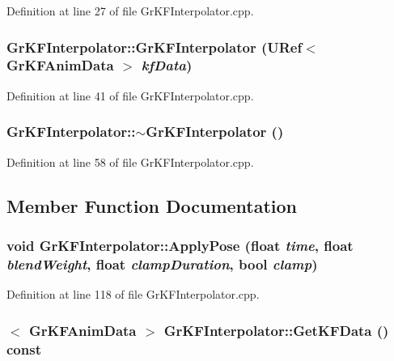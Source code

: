 Definition at line 27 of file GrKFInterpolator.cpp.\hypertarget{class_gr_k_f_interpolator_1724d4329b259e148c29d9169f612997}{
\subsubsection[{GrKFInterpolator}]{\setlength{\rightskip}{0pt plus 5cm}GrKFInterpolator::GrKFInterpolator ({\bf URef}$<$ {\bf GrKFAnimData} $>$ {\em kfData})}}
\label{class_gr_k_f_interpolator_1724d4329b259e148c29d9169f612997}




Definition at line 41 of file GrKFInterpolator.cpp.\hypertarget{class_gr_k_f_interpolator_c2cc750b63e0b4472fee654ec4bdea03}{
\subsubsection[{$\sim$GrKFInterpolator}]{\setlength{\rightskip}{0pt plus 5cm}GrKFInterpolator::$\sim$GrKFInterpolator ()}}
\label{class_gr_k_f_interpolator_c2cc750b63e0b4472fee654ec4bdea03}




Definition at line 58 of file GrKFInterpolator.cpp.

\subsection{Member Function Documentation}
\hypertarget{class_gr_k_f_interpolator_9733ebb52f02dff2b41993a80f199b3e}{
\subsubsection[{ApplyPose}]{\setlength{\rightskip}{0pt plus 5cm}void GrKFInterpolator::ApplyPose (float {\em time}, \/  float {\em blendWeight}, \/  float {\em clampDuration}, \/  bool {\em clamp})}}
\label{class_gr_k_f_interpolator_9733ebb52f02dff2b41993a80f199b3e}




Definition at line 118 of file GrKFInterpolator.cpp.\hypertarget{class_gr_k_f_interpolator_204daa62f5b8f1dbc7bd2bc0429b0c02}{
\subsubsection[{GetKFData}]{$<$ {\bf GrKFAnimData} $>$ GrKFInterpolator::GetKFData () const}}
\label{class_gr_k_f_interpolator_204daa62f5b8f1dbc7bd2bc0429b0c02}




